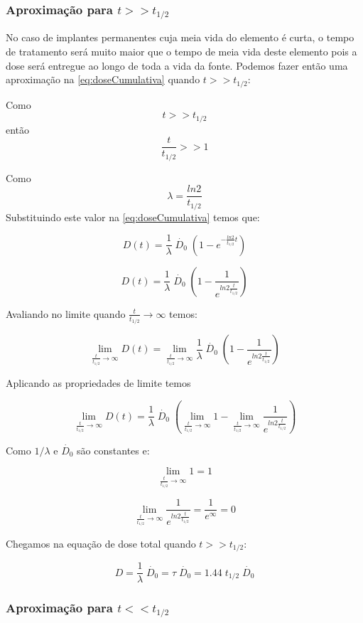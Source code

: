 \documentclass[11pt,a4paper]{article}
\begin{document}
\subsubsection*{Aproximação para $t >> t_{1/2}$}

	No caso de implantes permanentes cuja meia vida do elemento é curta, o tempo de tratamento será muito maior que o tempo de meia vida deste elemento pois a dose será entregue ao longo de toda a vida da fonte. Podemos fazer então uma aproximação na   \ref{eq:doseCumulativa} quando $t >> t_{1/2}$: 

	Como $$t >> t_{1/2}$$ então $$\frac{t}{t_{1/2}} >> 1$$

	Como $$\lambda = \frac{ln 2}{t_{1/2}}$$ Substituindo este valor na   \ref{eq:doseCumulativa} temos que: 

	$$ D(t) = \frac{1}{\lambda}  \; \dot{D_0} \; \left(1 - e^{-\frac{ln 2}{t_{1/2}} t}\right) $$

	$$D(t) = \frac{1}{\lambda}  \; \dot{D_0} \; \left(1 - \frac{1}{e^{ln 2 \frac{t}{t_{1/2}}}}\right)$$

	Avaliando no limite quando $\frac{t}{t_{1/2}} \rightarrow \infty$ temos:

	$$ \lim_{{\frac{t}{t_{1/2}}} \to \infty} D(t) = \lim_{{\frac{t}{t_{1/2}}} \to \infty} \frac{1}{\lambda}  \; \dot{D_0} \; \left(1 - \frac{1}{e^{ln 2 \frac{t}{t_{1/2}}}}\right)$$

	Aplicando as propriedades de limite temos

	$$\lim_{{\frac{t}{t_{1/2}}} \to \infty} D(t) = \frac{1}{\lambda} \; \dot{D_0} \;  \left(\lim_{{\frac{t}{t_{1/2}}} \to \infty} 1 - \lim_{{\frac{t}{t_{1/2}}} \to \infty} \frac{1}{e^{ln 2 \frac{t}{t_{1/2}}}}\right)$$

	Como $1/ \lambda$ e $\dot{D_0}$ são constantes e:

	$$\lim_{{\frac{t}{t_{1/2}}} \to \infty} 1 = 1$$

	$$\lim_{{\frac{t}{t_{1/2}}} \to \infty} \frac{1}{e^{ln 2 \frac{t}{t_{1/2}}}} = \frac{1}{e^{\infty}} = 0 $$

	Chegamos na equação de dose total quando $t >> t_{1/2}$:

			\begin{equation}
				D = \frac{1}{\lambda} \; \dot{D_0} = \tau \; \dot{D_0} = 1.44 \; t_{1/2} \; \dot{D_0}
				\label{eq:aproximacaoImplantesPermanentes}
			\end{equation}

\subsubsection*{Aproximação para $t << t_{1/2}$}
\end{document}
